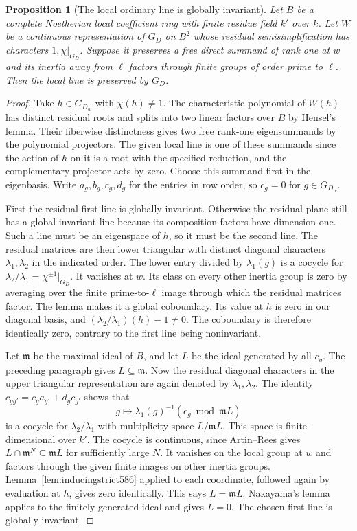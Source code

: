 \documentclass[a4paper,11pt]{article}
\newtheorem{proposition}{Proposition}[section]
\theoremstyle{definition}
\theoremstyle{remark}
\numberwithin{equation}{section}
\begin{document}
\begin{proposition}[The local ordinary line is globally invariant]
\leavevmode\label{prop:inducingline586}
Let \(B\) be a complete Noetherian local coefficient ring
with finite residue field \(k'\) over \(k\). Let \(W\) be
a continuous representation of \(G_D\) on \(B^2\) whose
residual semisimplification has characters \(1,\chi|_{G_D}\).
Suppose it preserves a free direct summand of rank one at
\(w\) and its inertia away from \(\ell\) factors through
finite groups of order prime to \(\ell\). Then the local
line is preserved by \(G_D\).
\end{proposition}
\begin{proof}
Take \(h\in G_{D_w}\) with \(\chi(h)\ne1\). The characteristic
polynomial of \(W(h)\) has distinct residual roots and splits
into two linear factors over \(B\) by Hensel's lemma. Their
fiberwise distinctness gives two free rank-one eigensummands
by the polynomial projectors. The given local line is one of
these summands since the action of \(h\) on it is a root with the
specified reduction, and the complementary projector acts by
zero. Choose this summand first in the eigenbasis. Write
\(a_g,b_g,c_g,d_g\) for the entries in row order, so \(c_g=0\)
for \(g\in G_{D_w}\).

First the residual first line is globally invariant. Otherwise
the residual plane still has a global invariant line because
its composition factors have dimension one. Such a line must
be an eigenspace of \(h\), so it must be the second line.
The residual matrices are then lower triangular with distinct
diagonal characters \(\lambda_1,\lambda_2\) in the indicated
order. The lower entry divided by \(\lambda_1(g)\) is a
cocycle for \(\lambda_2/\lambda_1=\chi^{\pm1}|_{G_D}\).
It vanishes at \(w\). Its class on every other inertia group
is zero by averaging over the finite prime-to-\(\ell\) image
through which the residual matrices factor. The lemma makes
it a global coboundary. Its value at \(h\) is zero in our
diagonal basis, and \((\lambda_2/\lambda_1)(h)-1\ne0\).
The coboundary is therefore identically zero, contrary to the
first line being noninvariant.

Let \(\mathfrak m\) be the maximal ideal of \(B\), and let
\(L\) be the ideal generated by all \(c_g\).
The preceding paragraph gives \(L\subseteq\mathfrak m\).
Now the residual diagonal characters in the upper triangular
representation are again denoted by \(\lambda_1,\lambda_2\).
The identity \(c_{gg'}=c_g a_{g'}+d_g c_{g'}\) shows that
\[
          g\longmapsto \lambda_1(g)^{-1}
                         (c_g\bmod\mathfrak m L)
\]
is a cocycle for \(\lambda_2/\lambda_1\) with multiplicity
space \(L/\mathfrak m L\). This space is finite-dimensional
over \(k'\). The cocycle is continuous, since Artin--Rees
gives \(L\cap\mathfrak m^N\subseteq\mathfrak m L\) for
sufficiently large \(N\). It vanishes on the local group
at \(w\) and factors through the given finite images on
other inertia groups. Lemma~\ref{lem:inducingstrict586}
applied to each coordinate, followed again by evaluation
at \(h\), gives zero identically. This says \(L=\mathfrak m L\).
Nakayama's lemma applies to the finitely generated ideal
and gives \(L=0\). The chosen first line is globally invariant.
\end{proof}
\end{document}

